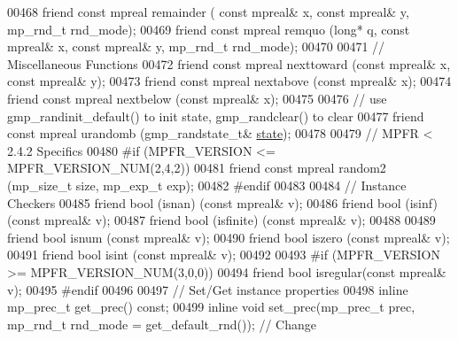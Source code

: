 \begin{DoxyCode}
00468     \textcolor{keyword}{friend} \textcolor{keyword}{const} mpreal remainder   (         \textcolor{keyword}{const} mpreal& x, \textcolor{keyword}{const} mpreal& y, mp\_rnd\_t rnd\_mode);
00469     \textcolor{keyword}{friend} \textcolor{keyword}{const} mpreal remquo      (\textcolor{keywordtype}{long}* q, \textcolor{keyword}{const} mpreal& x, \textcolor{keyword}{const} mpreal& y, mp\_rnd\_t rnd\_mode);
00470 
00471     \textcolor{comment}{// Miscellaneous Functions}
00472     \textcolor{keyword}{friend} \textcolor{keyword}{const} mpreal nexttoward (\textcolor{keyword}{const} mpreal& x, \textcolor{keyword}{const} mpreal& y);
00473     \textcolor{keyword}{friend} \textcolor{keyword}{const} mpreal nextabove  (\textcolor{keyword}{const} mpreal& x);
00474     \textcolor{keyword}{friend} \textcolor{keyword}{const} mpreal nextbelow  (\textcolor{keyword}{const} mpreal& x);
00475 
00476     \textcolor{comment}{// use gmp\_randinit\_default() to init state, gmp\_randclear() to clear}
00477     \textcolor{keyword}{friend} \textcolor{keyword}{const} mpreal urandomb (gmp\_randstate\_t& \hyperlink{structstate}{state});
00478 
00479 \textcolor{comment}{// MPFR < 2.4.2 Specifics}
00480 \textcolor{preprocessor}{#if (MPFR\_VERSION <= MPFR\_VERSION\_NUM(2,4,2))}
00481     \textcolor{keyword}{friend} \textcolor{keyword}{const} mpreal random2 (mp\_size\_t size, mp\_exp\_t exp);
00482 \textcolor{preprocessor}{#endif}
00483 
00484     \textcolor{comment}{// Instance Checkers}
00485     \textcolor{keyword}{friend} bool (isnan)    (\textcolor{keyword}{const} mpreal& v);
00486     \textcolor{keyword}{friend} bool (isinf)    (\textcolor{keyword}{const} mpreal& v);
00487     \textcolor{keyword}{friend} bool (isfinite) (\textcolor{keyword}{const} mpreal& v);
00488 
00489     \textcolor{keyword}{friend} \textcolor{keywordtype}{bool} isnum    (\textcolor{keyword}{const} mpreal& v);
00490     \textcolor{keyword}{friend} \textcolor{keywordtype}{bool} iszero   (\textcolor{keyword}{const} mpreal& v);
00491     \textcolor{keyword}{friend} \textcolor{keywordtype}{bool} isint    (\textcolor{keyword}{const} mpreal& v);
00492 
00493 \textcolor{preprocessor}{#if (MPFR\_VERSION >= MPFR\_VERSION\_NUM(3,0,0))}
00494     \textcolor{keyword}{friend} \textcolor{keywordtype}{bool} isregular(\textcolor{keyword}{const} mpreal& v);
00495 \textcolor{preprocessor}{#endif}
00496 
00497     \textcolor{comment}{// Set/Get instance properties}
00498     \textcolor{keyword}{inline} mp\_prec\_t    get\_prec() \textcolor{keyword}{const};
00499     \textcolor{keyword}{inline} \textcolor{keywordtype}{void}         set\_prec(mp\_prec\_t prec, mp\_rnd\_t rnd\_mode = get\_default\_rnd());    \textcolor{comment}{// Change
}
\end{DoxyCode}
